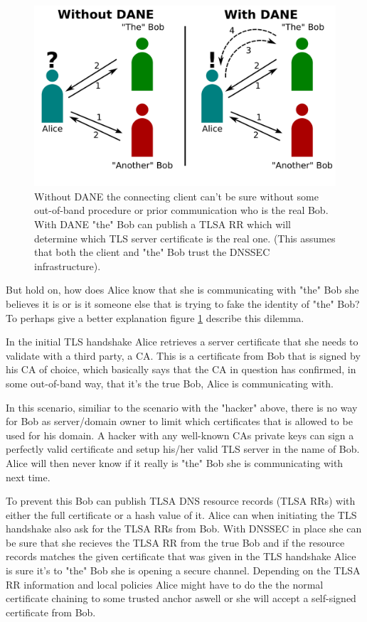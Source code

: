 \begin{figure}[ht]
\begin{center}
\includegraphics[scale=1]{Figures/daneWithAndWithoutDane.png}
\end{center}
\caption{Without DANE the connecting client can't be sure without some out-of-band procedure or prior communication who is the real Bob. With DANE "the" Bob can publish a TLSA RR which will determine which TLS server certificate is the real one. (This assumes that both the client and "the" Bob trust the DNSSEC infrastructure).\label{ch3:daneWithAndWithoutDane}}
\end{figure}


But hold on, how does Alice know that she is communicating with "the" Bob she believes it is or is it someone else that is trying to fake the identity of "the" Bob?
To perhaps give a better explanation figure \ref{ch3:daneWithAndWithoutDane} describe this dilemma.

In the initial TLS handshake Alice retrieves a server certificate that she needs to validate with a third party, a CA.
This is a certificate from Bob that is signed by his CA of choice, which basically says that the CA in question has confirmed, in some out-of-band way, that it's the true Bob, Alice is communicating with.

In this scenario, similiar to the scenario with the "hacker" above, there is no way for Bob as server/domain owner to limit which certificates that is allowed to be used for his domain.
A hacker with any well-known CAs private keys can sign a perfectly valid certificate and setup his/her valid TLS server in the name of Bob.
Alice will then never know if it really is "the" Bob she is communicating with next time.

To prevent this Bob can publish TLSA DNS resource records (TLSA RRs)\cite[ch. 2]{rfc:draft-dane} with either the full certificate or a hash value of it.
Alice can when initiating the TLS handshake also ask for the TLSA RRs from Bob.
With DNSSEC in place she can be sure that she recieves the TLSA RR from the true Bob and if the resource records matches the given certificate that was given in the TLS handshake Alice is sure it's to "the" Bob she is opening a secure channel.
Depending on the TLSA RR information and local policies Alice might have to do the the normal certificate chaining to some trusted anchor aswell or she will accept a self-signed certificate from Bob.

